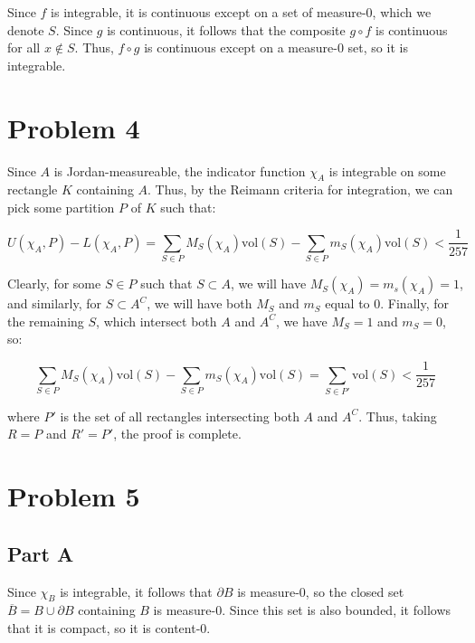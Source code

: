 \documentclass[10pt, oneside]{amsart}
\begin{document}
    Since $f$ is integrable, it is continuous except on a set of measure-$0$, which we denote $S$. Since $g$ is continuous, it follows that the composite $g \circ f$ is continuous for all $x \notin S$. Thus,
    $f \circ g$ is continuous except on a measure-$0$ set, so it is integrable.

    \hrulefill

    \section{Problem 4}

    Since $A$ is Jordan-measureable, the indicator function $\chi_A$ is integrable on some rectangle $K$ containing $A$. Thus, by the Reimann criteria for integration, we can pick some partition $P$ of $K$ such that:

    $$U(\chi_A, P) - L(\chi_A, P) = \displaystyle\sum_{S \in P} M_S(\chi_A) \text{vol}(S) - \displaystyle\sum_{S \in P} m_S(\chi_A) \text{vol}(S) < \frac{1}{257}$$

    Clearly, for some $S \in P$ such that $S \subset A$, we will have $M_S(\chi_A) = m_s(\chi_A) = 1$, and similarly, for $S \subset A^C$, we will have both $M_S$ and $m_S$ equal to $0$. Finally,
    for the remaining $S$, which intersect both $A$ and $A^C$, we have $M_S = 1$ and $m_S = 0$, so:

    $$\displaystyle\sum_{S \in P} M_S(\chi_A) \text{vol}(S) - \displaystyle\sum_{S \in P} m_S(\chi_A) \text{vol}(S) = \displaystyle\sum_{S \in P'} \text{vol}(S) < \frac{1}{257}$$

    where $P'$ is the set of all rectangles intersecting both $A$ and $A^C$. Thus, taking $R = P$ and $R' = P'$, the proof is complete.

    \hrulefill

    \section{Problem 5}

    \subsection{Part A} Since $\chi_B$ is integrable, it follows that $\partial B$ is measure-$0$, so the closed set $\overline{B} = B \cup \partial B$ containing $B$ is measure-$0$. Since this set is also
    bounded, it follows that it is compact, so it is content-$0$.
    \newline
\end{document}
